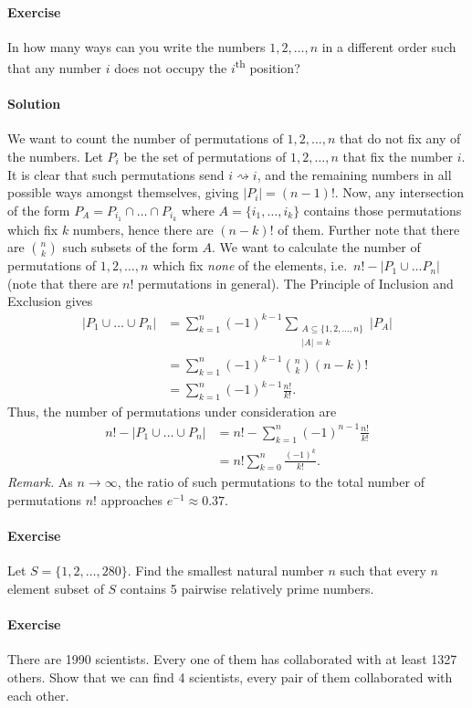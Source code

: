 \documentclass[10pt]{article}
\newcounter{prob}
\newcommand{\problem}{\stepcounter{prob}\paragraph{Exercise \arabic{prob}}}
\newcommand{\solution}{\paragraph{Solution}}
\begin{document}
    \problem In how many ways can you write the numbers $1, 2, \dots, n$ in a
    different order such that any number $i$ does not occupy the
    $i$\textsuperscript{th} position?

    \solution We want to count the number of permutations of $1, 2, \dots, n$ that do
    not fix any of the numbers. Let $P_i$ be the set of permutations of $1, 2, \dots,
    n$ that fix the number $i$. It is clear that such permutations send $i
    \rightsquigarrow i$, and the remaining numbers in all possible ways amongst
    themselves, giving $|P_i| = (n - 1)!$. Now, any intersection of the form $P_A =
    P_{i_1} \cap \dots \cap P_{i_k}$ where $A = \{i_1, \dots, i_k\}$ contains those
    permutations which fix $k$ numbers, hence there are $(n - k)!$ of them. Further
    note that there are $\binom{n}{k}$ such subsets of the form $A$. We want to
    calculate the number of permutations of $1, 2, \dots, n$ which fix \emph{none} of
    the elements, i.e.\ $n! - |P_1 \cup \dots P_n|$ (note that there are $n!$
    permutations in general). The Principle of Inclusion and Exclusion gives 
    \begin{align*}
        |P_1 \cup \dots \cup P_n| &= \sum_{k=1}^n (-1)^{k - 1}\sum_{\substack{A
        \subseteq \{1, 2, \dots, n\} \\ |A| = k}} |P_A| \\
        &= \sum_{k = 1}^n (-1)^{k - 1} \binom{n}{k} (n - k)! \\
        &= \sum_{k = 1}^n (-1)^{k - 1} \frac{n!}{k!}.
    \end{align*}
    Thus, the number of permutations under consideration are 
    \begin{align*}
        n! - |P_1 \cup \dots \cup P_n| &= n! - \sum_{k = 1}^n (-1)^{n - 1}
        \frac{n!}{k!} \\
        &= n!\sum_{k = 0}^n \frac{(-1)^{k}}{k!}.
    \end{align*}
    \emph{Remark.} As $n \to \infty$, the ratio of such permutations to the total
    number of permutations $n!$ approaches $e^{-1} \approx 0.37$.

    \problem Let $S = \{1, 2, \dots, 280\}$. Find the smallest natural number $n$
    such that every $n$ element subset of $S$ contains 5 pairwise relatively prime numbers.

    \problem There are 1990 scientists. Every one of them has collaborated with at
    least 1327 others. Show that we can find 4 scientists, every pair of them
    collaborated with each other.
\end{document}
